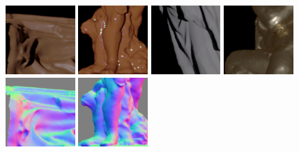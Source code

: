     \begin{subfigure}[t]{0.47\textwidth}
    \centering
    \\
    \includegraphics[width=0.235\textwidth]{ch-psfcn/images/Dataset/complex/l_000,-0.41,0.24,0.88_gm.png}
    \includegraphics[width=0.235\textwidth]{ch-psfcn/images/Dataset/complex/l_001,-0.05,0.02,1.00_gm.png}
    \includegraphics[width=0.235\textwidth]{ch-psfcn/images/Dataset/complex/l_005,0.25,0.03,0.97_gm.png}
    \includegraphics[width=0.235\textwidth]{ch-psfcn/images/Dataset/complex/l_012,-0.27,0.06,0.96_gm.png}
    \\
    \includegraphics[width=0.235\textwidth]{ch-psfcn/images/Dataset/complex/virgin-mary-with-her-dead-son_alabasteryy_s-0.08_x-000_y-180_000_normal.png}
    \includegraphics[width=0.235\textwidth]{ch-psfcn/images/Dataset/complex/wrestling-decimated-cleaned_aa-exported_s-0.06_x--90_y-100_010_normal.png}

\end{subfigure}
